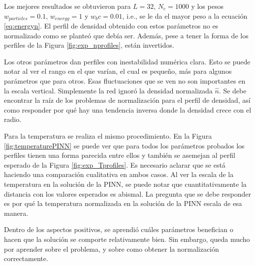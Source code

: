 Los mejores resultados se obtuvieron para $L = 32$, $N_c = 1000$ y los pesos $w_{particles} = 0.1$, $w_{energy} = 1$ y $w_bc = 0.01$, i.e., se le da el mayor peso a la ecuación \eqref{eq:energyn}. El perfil de densidad obtenido con estos parámetros no es normalizado como se planteó que debía ser. Además, pese a tener la forma de los perfiles de la Figura \ref{fig:exp_nprofiles}, están invertidos. 

Los otros parámetros dan perfiles con inestabilidad numérica clara. Esto se puede notar al ver el rango en el que varían, el cual es pequeño, más para algunos parámetros que para otros. Esas fluctuaciones que se ven no son importantes en la escala vertical. Simplemente la red ignoró la densidad normalizada $\hat{n}$. Se debe encontrar la raíz de los problemas de normalización para el perfil de densidad, así como responder por qué hay una tendencia inversa donde la densidad crece con el radio.

Para la temperatura se realiza el mismo procedimiento. En la Figura \ref{fig:temperaturePINN} se puede ver que para todos los parámetros probados los perfiles tienen una forma parecida entre ellos y también se asemejan al perfil esperado de la Figura \ref{fig:exp_Tprofiles}. Es necesario aclarar que se está haciendo una comparación cualitativa en ambos casos. Al ver la escala de la temperatura en la solución de la PINN, se puede notar que cuantitativamente la distancia con los valores esperados es abismal. La pregunta que se debe responder es por qué la temperatura normalizada en la solución de la PINN escala de esa manera. 

Dentro de los aspectos positivos, se aprendió cuáles parámetros benefician o hacen que la solución se comporte relativamente bien. Sin embargo, queda mucho por aprender sobre el problema, y sobre como obtener la normalización correctamente.


